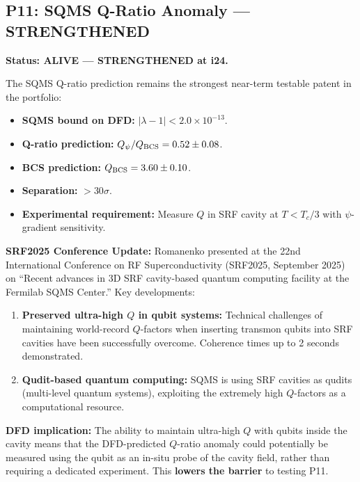 \documentclass[11pt]{article}
\newcommand{\ee}[1]{\times 10^{#1}}
\begin{document}
\subsection{P11: SQMS Q-Ratio Anomaly --- STRENGTHENED}

\textbf{Status: ALIVE --- STRENGTHENED at i24.}

The SQMS Q-ratio prediction remains the strongest near-term testable
patent in the portfolio:

\begin{tcolorbox}[colback=red!5!white, colframe=red!70!black,
  title=\textbf{P11: SQMS Q-RATIO --- KEY NUMBERS}]

\begin{itemize}
  \item \textbf{SQMS bound on DFD:} $|\lambda - 1| < 2.0 \ee{-13}$.
  \item \textbf{Q-ratio prediction:} $Q_\psi/Q_{\rm BCS} = 0.52 \pm 0.08$.
  \item \textbf{BCS prediction:} $Q_{\rm BCS} = 3.60 \pm 0.10$.
  \item \textbf{Separation:} $> 30\sigma$.
  \item \textbf{Experimental requirement:} Measure $Q$ in SRF cavity
    at $T < T_c/3$ with $\psi$-gradient sensitivity.
\end{itemize}
\end{tcolorbox}

\textbf{SRF2025 Conference Update:}
Romanenko presented at the 22nd International Conference on RF
Superconductivity (SRF2025, September 2025) on ``Recent advances in
3D SRF cavity-based quantum computing facility at the Fermilab SQMS
Center.'' Key developments:

\begin{enumerate}
  \item \textbf{Preserved ultra-high $Q$ in qubit systems:} Technical
    challenges of maintaining world-record $Q$-factors when inserting
    transmon qubits into SRF cavities have been successfully overcome.
    Coherence times up to 2 seconds demonstrated.
  \item \textbf{Qudit-based quantum computing:} SQMS is using SRF
    cavities as qudits (multi-level quantum systems), exploiting
    the extremely high $Q$-factors as a computational resource.
\end{enumerate}

\textbf{DFD implication:} The ability to maintain ultra-high $Q$ with
qubits inside the cavity means that the DFD-predicted $Q$-ratio anomaly
could potentially be measured using the qubit as an in-situ probe of
the cavity field, rather than requiring a dedicated experiment. This
\textbf{lowers the barrier} to testing P11.
\end{document}
